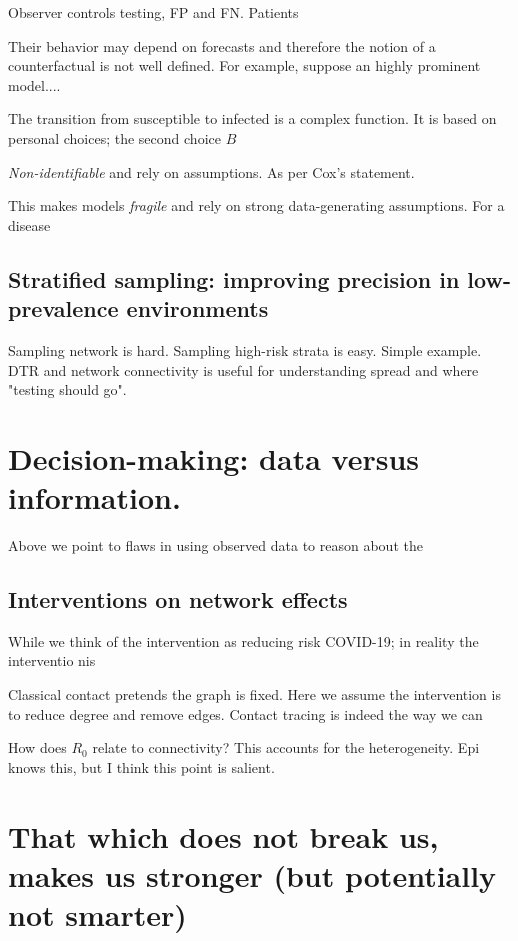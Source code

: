 \documentclass[12pt]{article}
\numberwithin{equation}{section}
\theoremstyle{plain}
\begin{document}
Observer controls testing, FP and FN.  Patients

Their behavior may depend on forecasts and therefore the notion of a counterfactual is not well defined.  For example, suppose an highly prominent model....

The transition from susceptible to infected is a complex function.  It is based on personal choices;  the second choice
$B$

\emph{Non-identifiable} and rely on assumptions.  As per Cox's statement.

This makes models \emph{fragile} and rely on strong data-generating assumptions.  For a disease

\subsection{Stratified sampling: improving precision in low-prevalence environments}

Sampling network is hard.  Sampling high-risk strata is easy.  Simple example.
DTR and network connectivity is useful for understanding spread and where "testing should go".

\section{Decision-making: data versus information.}

Above we point to flaws in using observed data to reason about the

\subsection{Interventions on network effects}

While we think of the intervention as reducing risk COVID-19; in reality the interventio nis

Classical contact pretends the graph is fixed.  Here we assume the intervention is to reduce degree and remove edges.  Contact tracing is indeed the way we can

How does $R_0$ relate to connectivity?  This accounts for the heterogeneity. Epi knows this, but I think this point is salient.



\section{That which does not break us, makes us stronger (but potentially not smarter)}
\end{document}
